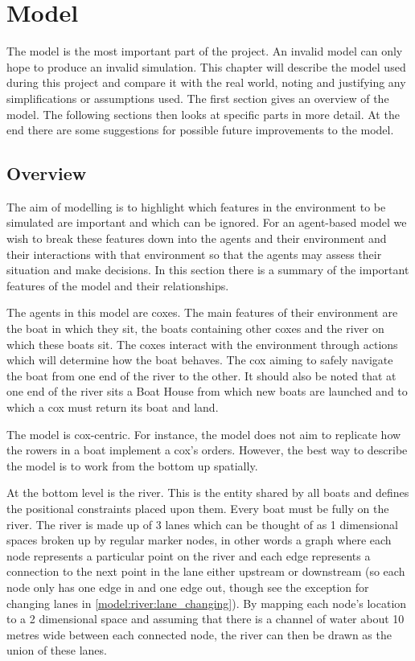\chapter{Model} \label{chapter:model}
  The model is the most important part of the project. An invalid model can only hope to produce an invalid simulation. This chapter will describe the model used during this project and compare it with the real world, noting and justifying any simplifications or assumptions used. The first section gives an overview of the model. The following sections then looks at specific parts in more detail. At the end there are some suggestions for possible future improvements to the model.
  
  \section{Overview}
    The aim of modelling is to highlight which features in the environment to be simulated are important and which can be ignored\cite{Sterling2009}. For an agent-based model we wish to break these features down into the agents and their environment and their interactions with that environment so that the agents may assess their situation and make decisions\cite{Bonabeau2002}. In this section there is a summary of the important features of the model and their relationships.
    
    The agents in this model are coxes. The main features of their environment are the boat in which they sit, the boats containing other coxes and the river on which these boats sit. The coxes interact with the environment through actions which will determine how the boat behaves. The cox aiming to safely navigate the boat from one end of the river to the other. It should also be noted that at one end of the river sits a Boat House from which new boats are launched and to which a cox must return its boat and land.
    
    The model is cox-centric. For instance, the model does not aim to replicate how the rowers in a boat implement a cox's orders. However, the best way to describe the model is to work from the bottom up spatially.
    
    At the bottom level is the river. This is the entity shared by all boats and defines the positional constraints placed upon them. Every boat must be fully on the river. The river is made up of 3 lanes which can be thought of as 1 dimensional spaces broken up by regular marker nodes, in other words a graph where each node represents a particular point on the river and each edge represents a connection to the next point in the lane either upstream or downstream (so each node only has one edge in and one edge out, though see the exception for changing lanes in \ref{model:river:lane_changing}). By mapping each node's location to a 2 dimensional space and assuming that there is a channel of water about 10 metres wide between each connected node, the river can then be drawn as the union of these lanes.
    
